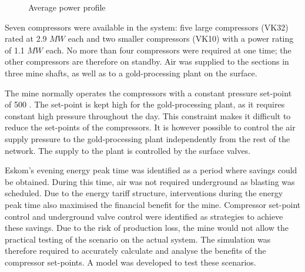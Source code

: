 \clearpage
\begin{figure}[h!]
	\centering
	
	\caption{Average power profile}
	\label{fig: Beatrix power baseline}
\end{figure}
 Seven compressors were available in the system: five large compressors (VK32) rated at 2.9 $MW$ each and two smaller compressors (VK10) with a power rating of 1.1 $MW$ each. No more than four compressors were required at one time; the other compressors are therefore on standby. Air was supplied to the sections in three mine shafts, as well as to a gold-processing plant on the surface. 
 \par 
 The mine normally operates the compressors with a constant pressure  set-point of 500 . The  set-point is kept high for the gold-processing plant, as it requires constant high pressure throughout the day. This constraint makes it difficult to reduce the  set-points of the compressors. It is however possible to control the air supply pressure to the gold-processing plant independently from the rest of the network. The supply to the plant is controlled by the surface valves.
 \par 
 Eskom's evening energy peak time was identified as a period where savings could be obtained. During this time, air was not required underground as blasting was scheduled. Due to the energy tariff structure, interventions during the energy peak time also maximised the financial benefit for the mine. Compressor set-point control and underground valve control were identified as strategies to achieve these savings. Due to the risk of production loss, the mine would not allow the practical testing of the scenario on the actual system. The simulation was therefore required to accurately calculate and analyse the benefits of the compressor set-points. A model was developed to test these scenarios.

